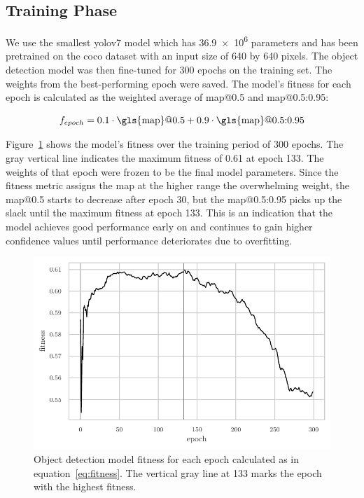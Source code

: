 \documentclass[final]{vutinfth} %
\begin{document}
\subsection{Training Phase}
\label{ssec:obj-training-phase}

We use the smallest \gls{yolo}v7 model which has \num{36.9e6}
parameters \cite{wang2022} and has been pretrained on the \gls{coco}
dataset \cite{lin2015} with an input size of \num{640} by \num{640}
pixels. The object detection model was then fine-tuned for \num{300}
epochs on the training set. The weights from the best-performing epoch
were saved. The model's fitness for each epoch is calculated as the
weighted average of \gls{map}@0.5 and \gls{map}@0.5:0.95:

\begin{equation}
  \label{eq:fitness}
  f_{epoch} = 0.1 \cdot \mathrm{\gls{map}}@0.5 + 0.9 \cdot \mathrm{\gls{map}}@0.5\mathrm{:}0.95
\end{equation}

Figure~\ref{fig:fitness} shows the model's fitness over the training
period of \num{300} epochs. The gray vertical line indicates the
maximum fitness of \num{0.61} at epoch \num{133}. The weights of that
epoch were frozen to be the final model parameters. Since the fitness
metric assigns the \gls{map} at the higher range the overwhelming
weight, the \gls{map}@0.5 starts to decrease after epoch \num{30}, but
the \gls{map}@0.5:0.95 picks up the slack until the maximum fitness at
epoch \num{133}. This is an indication that the model achieves good
performance early on and continues to gain higher confidence values
until performance deteriorates due to overfitting.

\begin{figure}
  \centering
  \includegraphics{graphics/model_fitness.pdf}
  \caption[Object detection fitness per epoch.]{Object detection model
    fitness for each epoch calculated as in
    equation~\ref{eq:fitness}. The vertical gray line at \num{133}
    marks the epoch with the highest fitness.}
  \label{fig:fitness}
\end{figure}
\end{document}
